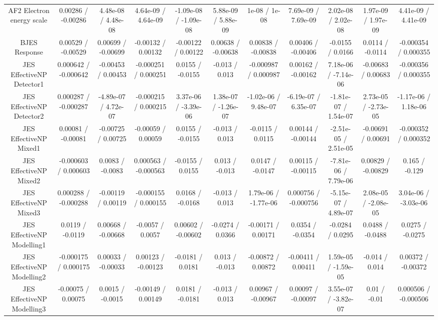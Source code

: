 \begin{table}[htbp]
\begin{center}
\begin{tabular}{|c|c|c|c|c|c|c|c|c|c|c|}
  AF2 Electron energy scale & 0.00286 / -0.00286 & 4.48e-08 / 4.48e-08 & 4.64e-09 / 4.64e-09 & -1.09e-08 / -1.09e-08 & 5.88e-09 / 5.88e-09 & 1e-08 / 1e-08 & 7.69e-09 / 7.69e-09 & 2.02e-08 / 2.02e-08 & 1.97e-09 / 1.97e-09 & 4.41e-09 / 4.41e-09 \\ 
  BJES Response & 0.00529 / -0.00529 & 0.00699 / -0.00699 & -0.00132 / 0.00132 & -0.00122 / 0.00122 & 0.00638 / -0.00638 & 0.00838 / -0.00838 & 0.00406 / -0.00406 & -0.0155 / 0.0166 & 0.0114 / -0.0114 & -0.000354 / 0.000355 \\ 
  JES EffectiveNP Detector1 & 0.000642 / -0.000642 & -0.00453 / 0.00453 & -0.000251 / 0.000251 & 0.0155 / -0.0155 & -0.013 / 0.013 & -0.000987 / 0.000987 & 0.00162 / -0.00162 & 7.18e-06 / -7.14e-06 & -0.00683 / 0.00683 & -0.000356 / 0.000355 \\ 
  JES EffectiveNP Detector2 & 0.000287 / -0.000287 & -4.89e-07 / 4.72e-07 & -0.000215 / 0.000215 & 3.37e-06 / -3.39e-06 & 1.38e-07 / -1.26e-07 & -1.02e-06 / 9.48e-07 & -6.19e-07 / 6.35e-07 & -1.81e-07 / 1.54e-07 & 2.73e-05 / -2.73e-05 & -1.17e-06 / 1.18e-06 \\ 
  JES EffectiveNP Mixed1 & 0.00081 / -0.00081 & -0.00725 / 0.00725 & -0.00059 / 0.00059 & 0.0155 / -0.0155 & -0.013 / 0.013 & -0.0115 / 0.0115 & 0.00144 / -0.00144 & -2.51e-05 / 2.51e-05 & -0.00691 / 0.00691 & -0.000352 / 0.000352 \\ 
  JES EffectiveNP Mixed2 & -0.000603 / 0.000603 & 0.0083 / -0.0083 & 0.000563 / -0.000563 & -0.0155 / 0.0155 & 0.013 / -0.013 & 0.0147 / -0.0147 & 0.00115 / -0.00115 & -7.81e-06 / 7.79e-06 & 0.00829 / -0.00829 & 0.165 / -0.129 \\ 
  JES EffectiveNP Mixed3 & 0.000288 / -0.000288 & -0.00119 / 0.00119 & -0.000155 / 0.000155 & 0.0168 / -0.0168 & -0.013 / 0.013 & 1.79e-06 / -1.77e-06 & 0.000756 / -0.000756 & -5.15e-07 / 4.89e-07 & 2.08e-05 / -2.08e-05 & 3.04e-06 / -3.03e-06 \\ 
  JES EffectiveNP Modelling1 & 0.0119 / -0.0119 & 0.00668 / -0.00668 & -0.0057 / 0.0057 & 0.00602 / -0.00602 & -0.0274 / 0.0366 & -0.00171 / 0.00171 & 0.0354 / -0.0354 & -0.0284 / 0.0295 & 0.0488 / -0.0488 & 0.0275 / -0.0275 \\ 
  JES EffectiveNP Modelling2 & -0.000175 / 0.000175 & 0.00033 / -0.00033 & 0.00123 / -0.00123 & -0.0181 / 0.0181 & 0.013 / -0.013 & -0.00872 / 0.00872 & -0.00411 / 0.00411 & 1.59e-05 / -1.59e-05 & -0.014 / 0.014 & 0.00372 / -0.00372 \\ 
  JES EffectiveNP Modelling3 & -0.00075 / 0.00075 & 0.0015 / -0.0015 & -0.00149 / 0.00149 & 0.0181 / -0.0181 & -0.013 / 0.013 & 0.00967 / -0.00967 & 0.00097 / -0.00097 & 3.55e-07 / -3.82e-07 & 0.01 / -0.01 & 0.000506 / -0.000506 \\ 

\end{tabular}
\end{center}
\end{table}

